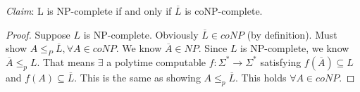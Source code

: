 \emph{Claim}:  L is NP-complete if and only if $\overline{L}$ is coNP-complete.

\begin{proof}
    Suppose $L$ is NP-complete. Obviously $\overline{L} \in coNP$ (by definition). Must show $A \leq_{P} \overline{L}, \forall A \in coNP$. We know $\overline{A} \in NP$. Since $L$ is NP-complete, we know $\overline{A} \leq_{p} L$. That means $\exists$ a polytime computable $f : \Sigma^* \rightarrow \Sigma^*$ satisfying $f(\overline{A}) \subseteq L$ and $f(A) \subseteq \overline{L}$. This is the same as showing $A \leq_{p} \overline{L}$. This holds $\forall A \in coNP$.
\end{proof}
